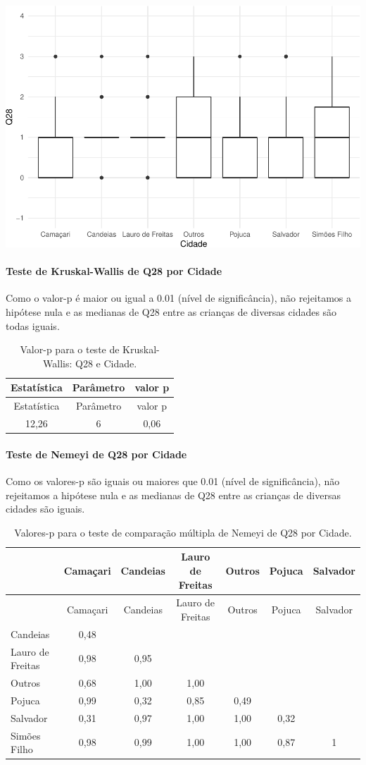 \documentclass[]{article}
\let\oldparagraph\paragraph
\renewcommand{\paragraph}[1]{\oldparagraph{#1}\mbox{}}
\begin{document}
\begin{center}\includegraphics[width=0.75\linewidth]{relatorio_covid19_files/figure-latex/unnamed-chunk-844-1} \end{center}

\hypertarget{teste-de-kruskal-wallis-de-q28-por-cidade}{%
\paragraph{Teste de Kruskal-Wallis de Q28 por Cidade}\label{teste-de-kruskal-wallis-de-q28-por-cidade}}

Como o valor-p é maior ou igual a 0.01 (nível de significância), não rejeitamos a hipótese nula e as medianas de Q28 entre as crianças de diversas cidades são todas iguais.

\begin{longtable}[]{@{}ccc@{}}
\caption{\label{tab:unnamed-chunk-846}Valor-p para o teste de Kruskal-Wallis: Q28 e Cidade.}\tabularnewline
\toprule
Estatística & Parâmetro & valor p\tabularnewline
\midrule
\endfirsthead
\toprule
Estatística & Parâmetro & valor p\tabularnewline
\midrule
\endhead
12,26 & 6 & 0,06\tabularnewline
\bottomrule
\end{longtable}

\hypertarget{teste-de-nemeyi-de-q28-por-cidade}{%
\paragraph{Teste de Nemeyi de Q28 por Cidade}\label{teste-de-nemeyi-de-q28-por-cidade}}

Como os valores-p são iguais ou maiores que 0.01 (nível de significância), não rejeitamos a hipótese nula e as medianas de Q28 entre as crianças de diversas cidades são iguais.

\begin{longtable}[]{@{}lcccccc@{}}
\caption{\label{tab:unnamed-chunk-848}Valores-p para o teste de comparação múltipla de Nemeyi de Q28 por Cidade.}\tabularnewline
\toprule
& Camaçari & Candeias & Lauro de Freitas & Outros & Pojuca & Salvador\tabularnewline
\midrule
\endfirsthead
\toprule
& Camaçari & Candeias & Lauro de Freitas & Outros & Pojuca & Salvador\tabularnewline
\midrule
\endhead
Candeias & 0,48 & & & & &\tabularnewline
Lauro de Freitas & 0,98 & 0,95 & & & &\tabularnewline
Outros & 0,68 & 1,00 & 1,00 & & &\tabularnewline
Pojuca & 0,99 & 0,32 & 0,85 & 0,49 & &\tabularnewline
Salvador & 0,31 & 0,97 & 1,00 & 1,00 & 0,32 &\tabularnewline
Simões Filho & 0,98 & 0,99 & 1,00 & 1,00 & 0,87 & 1\tabularnewline
\bottomrule
\end{longtable}
\end{document}
